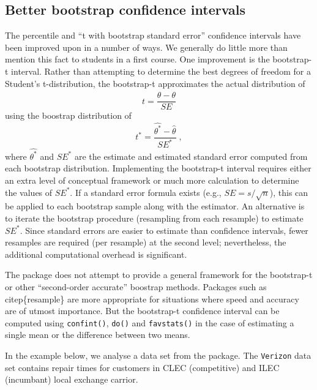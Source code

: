 \subsection{Better bootstrap confidence
intervals}\label{better-bootstrap-confidence-intervals}

The percentile and ``t with bootstrap standard error'' confidence
intervals have been improved upon in a number of ways. We generally do
little more than mention this fact to students in a first course. One
improvement is the bootstrap-t interval. Rather than attempting to
determine the best degrees of freedom for a Student's t-distribution,
the bootstrap-t approximates the actual distribution of \[
t = \frac{\hat{\theta} - \theta}{SE}
\] using the boostrap distribution of \[
t^* = \frac{\hat{\theta^*} - \hat{\theta}}{SE^*} \; ,
\] where \(\hat{\theta^*}\) and \(SE^*\) are the estimate and estimated
standard error computed from each bootstrap distribution. Implementing
the bootstrap-t interval requires either an extra level of conceptual
framework or much more calculation to determine the values of \(SE^*\).
If a standard error formula exists (e.g., \(SE = s/\sqrt{n}\)), this can
be applied to each bootstrap sample along with the estimator. An
alternative is to iterate the bootstrap procedure (resampling from each
resample) to estimate \(SE^*\). Since standard errors are easier to
estimate than confidence intervals, fewer resamples are required (per
resample) at the second level; nevertheless, the additional
computational overhead is significant.

The  package does not attempt to provide a general framework
for the bootstrap-t or other ``second-order accurate'' boostrap methods.
Packages such as  citep\{resample\} are more
appropriate for situations where speed and accuracy are of utmost
importance. But the bootstrap-t confidence interval can be computed
using \texttt{confint()}, \texttt{do()} and \texttt{favstats()} in the
case of estimating a single mean or the difference between two means.

In the example below, we analyse a data set from the 
package. The \texttt{Verizon} data set contains repair times for
customers in CLEC (competitive) and ILEC (incumbant) local exchange
carrior.

